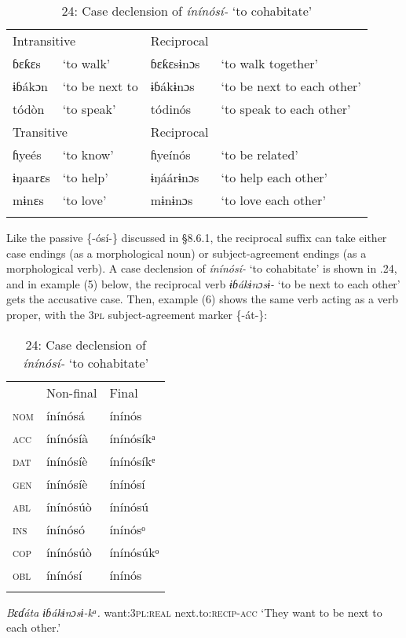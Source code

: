 \begin{table}
\begin{table}
\begin{tabularx}{\textwidth}{XXXX}
\multicolumn{2}{X}{Intransitive} & \multicolumn{2}{X}{Reciprocal}\\
ɓɛƙɛs & ‘to walk’ & ɓɛƙɛsɨnɔs & ‘to walk together’\\
ɨɓákɔn & ‘to be next to & ɨɓákɨnɔs & ‘to be next to each other’\\
tódòn & ‘to speak’ & tódinós & ‘to speak to each other’\\
\multicolumn{2}{X}{Transitive} & Reciprocal & \\
ɦyeés & ‘to know’ & ɦyeínós & ‘to be related’\\
ɨŋaarɛs & ‘to help’ & ɨŋáárɨnɔs & ‘to help each other’\\
mɨnɛs & ‘to love’ & mɨnɨnɔs & ‘to love each other’\\
\lspbottomrule
\end{tabularx}
\end{table}
Like the passive \{-ósí-\} discussed in §8.6.1, the reciprocal suffix can take either case endings (as a morphological noun) or subject-agreement endings (as a morphological verb). A case declension of \textit{ínínósí- }‘to cohabitate’ is shown in .24, and in example (5) below, the reciprocal verb \textit{ɨɓákɨnɔsɨ- }‘to be next to each other’ gets the accusative case. Then, example (6) shows the same verb acting as a verb proper, with the 3\textsc{pl} subject-agreement marker \{-át-\}:


\begin{table}
\caption{24: Case declension of \textit{ínínósí- }‘to cohabitate’}
\label{tab:8}


\begin{tabularx}{\textwidth}{XXX} & Non-final & Final\\
\lsptoprule
\textsc{nom} & ínínósá & ínínós\\
\textsc{acc} & ínínósíà & ínínósíkᵃ\\
\textsc{dat} & ínínósíè & ínínósíkᵉ\\
\textsc{gen} & ínínósíè & ínínósí\\
\textsc{abl} & ínínósúò & ínínósú\\
\textsc{ins} & ínínósó & ínínósᵒ\\
\textsc{cop} & ínínósúò & ínínósúkᵒ\\
\textsc{obl} & ínínósí & ínínós\\
\lspbottomrule
\end{tabularx}
\end{table}



\textit{Bɛɗáta     ɨɓák}\textit{ɨnɔsɨ}\textit{{}-kᵃ.}
want:\textsc{3pl:real}   next.to:\textsc{recip-acc}
‘They want to be next to each other.’





\end{table}
